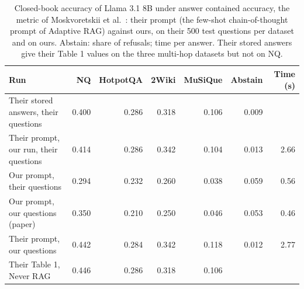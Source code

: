 \begin{table}[t]
\centering\small
\setlength{\tabcolsep}{4pt}
\caption{Closed-book accuracy of Llama 3.1 8B under answer contained accuracy, the metric of Moskvoretskii et al.~\cite{moskvoretskii2025adaptive}: their prompt (the few-shot chain-of-thought prompt of Adaptive RAG) against ours, on their 500 test questions per dataset and on ours. Abstain: share of refusals; time per answer. Their stored answers give their Table 1 values on the three multi-hop datasets but not on NQ.}
\label{tab:extra_closedbook}
\begin{tabular*}{\linewidth}{@{\extracolsep{\fill}}lrrrrrr}
\toprule
Run & NQ & HotpotQA & 2Wiki & MuSiQue & Abstain & Time (s) \\
\midrule
Their stored answers, their questions & 0.400 & 0.286 & 0.318 & 0.106 & 0.009 &  \\
Their prompt, our run, their questions & 0.414 & 0.286 & 0.342 & 0.104 & 0.013 & 2.66 \\
Our prompt, their questions & 0.294 & 0.232 & 0.260 & 0.038 & 0.059 & 0.56 \\
Our prompt, our questions (paper) & 0.350 & 0.210 & 0.250 & 0.046 & 0.053 & 0.46 \\
Their prompt, our questions & 0.442 & 0.284 & 0.342 & 0.118 & 0.012 & 2.77 \\
Their Table 1, Never RAG & 0.446 & 0.286 & 0.318 & 0.106 &  &  \\
\bottomrule
\end{tabular*}
\end{table}

